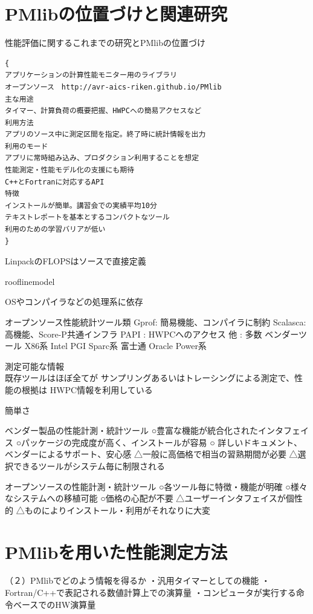 \documentclass[submit,techrep,noauthor]{ipsj}
\begin{document}
\section{PMlibの位置づけと関連研究}
性能評価に関するこれまでの研究とPMlibの位置づけ

\begin{verbatim}
{
アプリケーションの計算性能モニター用のライブラリ
オープンソース　http://avr-aics-riken.github.io/PMlib
主な用途
タイマー、計算負荷の概要把握、HWPCへの簡易アクセスなど
利用方法
アプリのソース中に測定区間を指定。終了時に統計情報を出力
利用のモード
アプリに常時組み込み、プロダクション利用することを想定
性能測定・性能モデル化の支援にも期待
C++とFortranに対応するAPI 
特徴
インストールが簡単。講習会での実績平均10分
テキストレポートを基本とするコンパクトなツール
利用のための学習バリアが低い
}
\end{verbatim}

LinpackのFLOPSはソースで直接定義


rooflinemodel

OSやコンパイラなどの処理系に依存

オープンソース性能統計ツール類 {
Gprof: 簡易機能、コンパイラに制約
Scalasca: 高機能、Score-P共通インフラ
PAPI : HWPCへのアクセス
他 : 多数
}
ベンダーツール {
X86系
Intel
PGI
Sparc系
富士通
Oracle
Power系
}



測定可能な情報\\
{
既存ツールはほぼ全てが
サンプリングあるいはトレーシングによる測定で、性能の根拠は
HWPC情報を利用している
}

簡単さ\\
{
ベンダー製品の性能計測・統計ツール
○豊富な機能が統合化されたインタフェイス
○パッケージの完成度が高く、インストールが容易
○ 詳しいドキュメント、ベンダーによるサポート、安心感
△一般に高価格で相当の習熟期間が必要
△選択できるツールがシステム毎に制限される

オープンソースの性能計測・統計ツール
○各ツール毎に特徴・機能が明確
○様々なシステムへの移植可能
○価格の心配が不要
△ユーザーインタフェイスが個性的
△ものによりインストール・利用がそれなりに大変
}


\section{PMlibを用いた性能測定方法}


（２）PMlibでどのよう情報を得るか
・汎用タイマーとしての機能
・Fortran/C++で表記される数値計算上での演算量
・コンピュータが実行する命令ベースでのHW演算量
\end{document}
